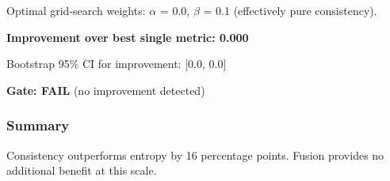 Optimal grid-search weights: $\alpha$ = 0.0, $\beta$ = 0.1 (effectively pure consistency).

\textbf{Improvement over best single metric: 0.000}

Bootstrap 95\% CI for improvement: [0.0, 0.0]

\textbf{Gate: FAIL} (no improvement detected)

\subsubsection{Summary}

\begin{table}[htbp]
\centering
{}
\end{table}

Consistency outperforms entropy by 16 percentage points. Fusion provides no additional benefit at this scale.

